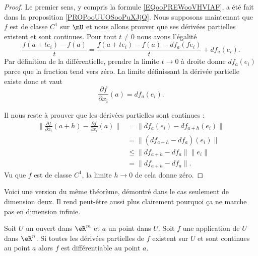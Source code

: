 \begin{proof}
    Le premier sens, y compris la formule \eqref{EQooPREWooVHVIAF}, a été fait dans la proposition \ref{PROPooUUOSooPuXJjQ}. Nous supposons maintenant que \( f\) est de classe \( C^1\) sur \( \mU\) et nous allons prouver que ses dérivées partielles existent et sont continues. Pour tout \( t\neq 0\) nous avons l'égalité
    \begin{equation}
        \frac{ f(a+te_i)-f(a) }{ t }=\frac{ f(a+te_i)-f(a)-df_a(fe_i) }{ t }+df_a(e_i).
    \end{equation}
    Par définition de la différentielle, prendre la limite \( t\to 0\) à droite donne \( df_a(e_i)\) parce que la fraction tend vers zéro. La limite définissant la dérivée partielle existe donc et vaut
    \begin{equation}
        \frac{ \partial f }{ \partial x_i }(a)=df_a(e_i).
    \end{equation}
    
    Il nous reste à prouver que les dérivées partielles sont continues :
    \begin{subequations}
        \begin{align}
            \| \frac{ \partial f }{ \partial x_i }(a+h)-\frac{ \partial f }{ \partial x_i }(a) \|&=\| df_{a}(e_i)-df_{a+h}(e_i) \|\\
            &=\| (df_{a+h}-df_a)(e_i) \|\\
            &\leq \| df_{a+h}-df_a \|\| e_i \|\\
            &= \| df_{a+h}-df_a \|.
        \end{align}
    \end{subequations}
    Vu que \( f\) est de classe \( C^1\), la limite \( h\to 0\) de cela donne zéro.
\end{proof}

Voici une version du même théorème, démontré dans le cas seulement de dimension deux. Il rend peut-être aussi plus clairement pourquoi ça ne marche pas en dimension infinie.

\begin{proposition}		\label{Diff_totale}     %
    Soit $U$ un ouvert dans $\eR^m$ et $a$ un point dans $U$. Soit $f$ une application de $U$ dans $\eR^n$. Si toutes les dérivées partielles de $f$ existent sur \( U\) et sont continues au point $a$ alors $f$ est différentiable au point $a$.
\end{proposition}

